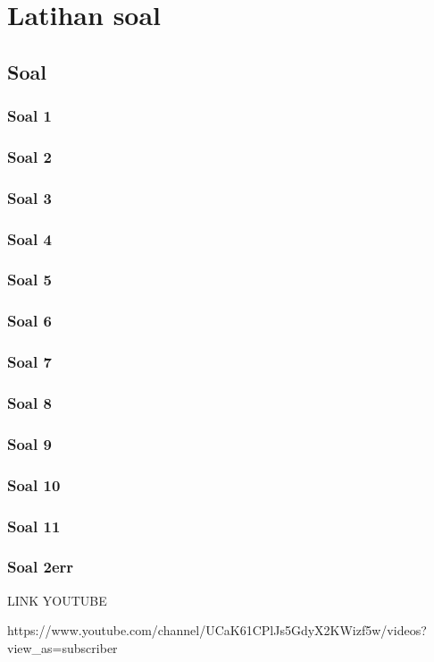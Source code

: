         
\chapter{Latihan soal}
\section{Soal}
\subsection{Soal 1}

\subsection{Soal 2}

\subsection{Soal 3}

\subsection{Soal 4}

\subsection{Soal 5}

\subsection{Soal 6}

\subsection{Soal 7}

\subsection{Soal 8}

\subsection{Soal 9}

\subsection{Soal 10}

\subsection{Soal 11}

\subsection{Soal 2err}


\par LINK YOUTUBE
\par https://www.youtube.com/channel/UCaK61CPlJs5GdyX2KWizf5w/videos?view_as=subscri\pra ber
